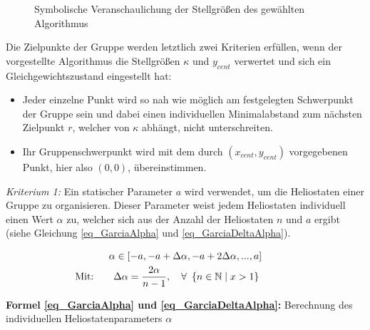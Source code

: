 \begin{figure}[h!]
    \centering
    \setlength{\fboxsep}{1pt}
    \setlength{\fboxrule}{1pt}
\caption[Symbolische Veranschaulichung der Stellgrößen des gewählten Algorithmus]{Symbolische Veranschaulichung der Stellgrößen des gewählten Algorithmus \cite[S. 7]{Garcia2}}
    \label{fig_DispersionVeranschaulichung}
\end{figure}


Die Zielpunkte der Gruppe werden letztlich zwei Kriterien erfüllen, wenn der vorgestellte Algorithmus die Stellgrößen $\kappa$ und $y_{cent}$ verwertet und sich ein Gleichgewichtszustand eingestellt hat:
\begin{itemize}
    \item Jeder einzelne Punkt wird so nah wie möglich am festgelegten Schwerpunkt der Gruppe sein und dabei einen individuellen Minimalabstand zum nächsten Zielpunkt $r$, welcher von $\kappa$ abhängt, nicht unterschreiten.
    \item Ihr Gruppenschwerpunkt wird mit dem durch $(x_{cent}, y_{cent})$ vorgegebenen Punkt, hier also $(0,0)$, übereinstimmen.
\end{itemize}

\textit{Kriterium 1:}
Ein statischer Parameter $a$ wird verwendet, um die Heliostaten einer Gruppe zu organisieren. Dieser Parameter weist jedem Heliostaten individuell einen Wert $\alpha$ zu, welcher sich aus der Anzahl der Heliostaten $n$ und $a$ ergibt (siehe Gleichung \ref{eq_GarciaAlpha} und \ref{eq_GarciaDeltaAlpha}).

\begin{gather}
    \alpha \in \left[-a, -a+\Delta\alpha, -a+2\Delta\alpha,..., a\right] \label{eq_GarciaAlpha}\\
    \text{\myequations{\quad Berechnung des individuellen Heliostatenparameters $\alpha$}}
    \text{Mit:\qquad}\Delta\alpha = \frac{2\alpha}{n-1}, \quad \forall~\left\{n \in \mathbb{N} \mid x > 1 \right\} \qquad\qquad \label{eq_GarciaDeltaAlpha}
\end{gather}
\centerline{\small{\textsf{\textbf{Formel \ref{eq_GarciaAlpha} und \ref{eq_GarciaDeltaAlpha}:}} Berechnung des individuellen Heliostatenparameters $\alpha$}}

